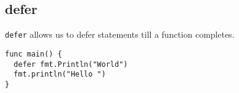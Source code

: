 \subsection{defer}
\texttt{defer} allows us to defer statements till a function completes.
\begin{lstlisting}
func main() {
  defer fmt.Println("World")
  fmt.println("Hello ")
}\end{lstlisting}
